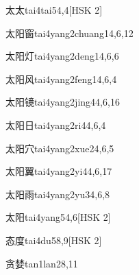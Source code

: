 \begin{entry}{太太}{tai4tai5}{4,4}[HSK 2]
\end{entry}

\begin{entry}{太阳窗}{tai4yang2chuang1}{4,6,12}
\end{entry}

\begin{entry}{太阳灯}{tai4yang2deng1}{4,6,6}
\end{entry}

\begin{entry}{太阳风}{tai4yang2feng1}{4,6,4}
\end{entry}

\begin{entry}{太阳镜}{tai4yang2jing4}{4,6,16}
\end{entry}

\begin{entry}{太阳日}{tai4yang2ri4}{4,6,4}
\end{entry}

\begin{entry}{太阳穴}{tai4yang2xue2}{4,6,5}
\end{entry}

\begin{entry}{太阳翼}{tai4yang2yi4}{4,6,17}
\end{entry}

\begin{entry}{太阳雨}{tai4yang2yu3}{4,6,8}
\end{entry}

\begin{entry}{太阳}{tai4yang5}{4,6}[HSK 2]
\end{entry}

\begin{entry}{态度}{tai4du5}{8,9}[HSK 2]
\end{entry}

\begin{entry}{贪婪}{tan1lan2}{8,11}
\end{entry}

